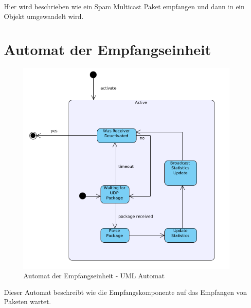 Hier wird beschrieben wie ein Spam Multicast Paket empfangen und
dann in ein Objekt umgewandelt wird.

\section{Automat der Empfangseinheit}
\label{sec:5:recmc}
\begin{figure}[H]
\includegraphics[width=15cm]{images/ReceiveState.png}
\centering
\caption{Automat der Empfangseinheit - UML Automat}
\label{fig_rcvstate}
\end{figure}

Dieser Automat beschreibt wie die Empfangskomponente auf das Empfangen
von Paketen wartet.

